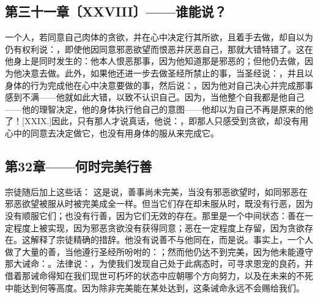 
\subsection{第三十一章〔XXVIII〕——谁能说？}

一个人，若同意自己肉体的贪欲，并在心中决定行其所欲，且着手去做，却自以为仍有权利说：，即使他因同意邪恶欲望而恨恶并厌恶自己，那就大错特错了。这在他身上是同时发生的：他本人恨恶那事，因为他知道那是邪恶的；但他仍去做，因为他决意去做。此外，如果他还进一步去做圣经所禁止的事，当圣经说：，并且以身体的行为完成他在心中决意要做的事，然后说：，因为他对自己决心并完成那事感到不满——他就如此大错，以致不认识自己。因为，当他整个自我都是他自己——他的理智决定，他的身体执行他自己的意图——他却以为自己不再是原来的他了！[XXIX.]因此，只有那人才说真话，他说：，即那人只感受到贪欲，却没有用心中的同意去决定做它，也没有用身体的服从来完成它。\par


\subsection{第32章——何时完美行善}

宗徒随后加上这些话： 这是说，善事尚未完美，当没有邪恶欲望时，如同邪恶在邪恶欲望被服从时被完美成全一样。但当它们存在却未服从时，既没有行恶，因为没有顺服它们；也没有行善，因为它们无效的存在。那里是一个中间状态：善在一定程度上被实现，因为邪恶贪欲没有获得同意；恶在一定程度上存留，因为贪欲存在。这解释了宗徒精确的措辞。他没有说善不与他同在，而是说。事实上，一个人做了大量的善，当他遵行圣经所吩咐的：；然而他仍达不到完美，因为他未能遵守那大诫命：。法律说：，为使我们发现自己处于此病态时，可寻求恩宠的良药，并借着那诫命得知在我们现世可朽坏的状态中应朝哪个方向努力，以及在未来的不死中能达到何等高度。因为除非完美能在某处达到，这条诫命永远不会赐给我们。\par

